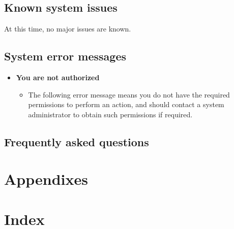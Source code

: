 \documentclass[a4paper,12pt]{article}
\begin{document}
	    \subsection{Known system issues}
	    
	    At this time, no major issues are known.
	    
	    \subsection{System error messages}
	    
	    \begin{itemize}
	    	\item \textbf{You are not authorized}
	    	\begin{itemize}
	    		\item The following error message means you do not have the required permissions to perform an action, and should contact a system administrator to obtain such permissions if required.
	    	\end{itemize}
	    \end{itemize}
	    
	    \subsection{Frequently asked questions}
	 
	\pagebreak
	 
    \section{Appendixes}
    
    \section{Index}
    
    \pagebreak  
\end{document}
